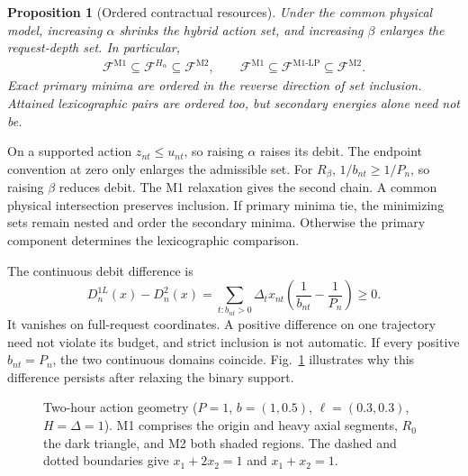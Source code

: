 \documentclass[10pt,journal]{IEEEtran}
\newtheorem{proposition}{Proposition}
\newcommand{\Mone}{\mathrm{M1}}
\newcommand{\Mtwo}{\mathrm{M2}}
\newcommand{\Mlp}{\mathrm{M1\text{-}LP}}
\newcommand{\F}{\mathcal F}
\begin{document}
\begin{proposition}[Ordered contractual resources]
\label{prop:hierarchy}
Under the common physical model, increasing $\alpha$ shrinks the hybrid action set, and increasing $\beta$ enlarges the request-depth set. In particular,
\begin{gather}
\F^{\Mone}\subseteq\F^{H_\alpha}\subseteq\F^{\Mtwo},\qquad
\F^{\Mone}\subseteq\F^{\Mlp}\subseteq\F^{\Mtwo}.\label{eq:hierarchy}
\end{gather}
Exact primary minima are ordered in the reverse direction of set inclusion. Attained lexicographic pairs are ordered too, but secondary energies alone need not be.
\end{proposition}
\begin{IEEEproof}
On a supported action $z_{nt}\leq u_{nt}$, so raising $\alpha$ raises its debit. The endpoint convention at zero only enlarges the admissible set. For $R_\beta$, $1/b_{nt}\geq1/P_n$, so raising $\beta$ reduces debit. The M1 relaxation gives the second chain. A common physical intersection preserves inclusion. If primary minima tie, the minimizing sets remain nested and order the secondary minima. Otherwise the primary component determines the lexicographic comparison.
\end{IEEEproof}
The continuous debit difference is
\begin{equation}
D_n^{1L}(x)-D_n^2(x)=\sum_{t:b_{nt}>0}\Delta_tx_{nt}
\left(\frac1{b_{nt}}-\frac1{P_n}\right)\geq0.
\label{eq:wedge}
\end{equation}
It vanishes on full-request coordinates. A positive difference on one trajectory need not violate its budget, and strict inclusion is not automatic. If every positive $b_{nt}=P_n$, the two continuous domains coincide. Fig.~\ref{fig:geometry} illustrates why this difference persists after relaxing the binary support.

\begin{figure}[t]
\centering
{}
\caption{Two-hour action geometry ($P=1$, $b=(1,0.5)$, $\ell=(0.3,0.3)$, $H=\Delta=1$). M1 comprises the origin and heavy axial segments, $R_0$ the dark triangle, and M2 both shaded regions. The dashed and dotted boundaries give $x_1+2x_2=1$ and $x_1+x_2=1$.}
\label{fig:geometry}
\end{figure}
\end{document}
